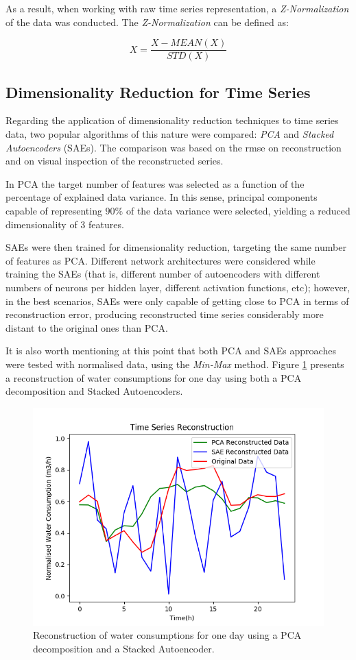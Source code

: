 \documentclass[9pt,journal,compsoc]{IEEEtran}
\begin{document}
As a result, when working with raw time series representation, a \emph{Z-Normalization} of the data was conducted. The \emph{Z-Normalization} can be defined as:

$$X = \frac{X - MEAN(X)}{STD(X)} $$

\subsection{Dimensionality Reduction for Time Series}

Regarding the application of dimensionality reduction techniques to time series data, two popular algorithms of this nature were compared: \emph{PCA} and \emph{Stacked Autoencoders} (SAEs). The comparison was based on the rmse on reconstruction and on visual inspection of the reconstructed series.

In PCA the target number of features was selected as a function of the percentage of explained data variance. In this sense, principal components capable of representing $90\%$ of the data variance were selected, yielding a reduced dimensionality of 3 features.

SAEs were then trained for dimensionality reduction, targeting the same number of features as PCA. Different network architectures were considered while training the SAEs (that is, different number of autoencoders with different numbers of neurons per hidden layer, different activation functions, etc); however, in the best scenarios, SAEs were only capable of getting close to PCA in terms of reconstruction error, producing reconstructed time series considerably more distant to the original ones than PCA.

It is also worth mentioning at this point that both PCA and SAEs approaches were tested with normalised data, using the \emph{Min-Max} method. Figure \ref{day3_reconstruction} presents a reconstruction of water consumptions for one day using both a PCA decomposition and Stacked Autoencoders.

\begin{figure}[ht]
	\centering
	\includegraphics[scale=0.5]{images/pca_sae_day3.png}
	\caption{Reconstruction of water consumptions for one day using a PCA decomposition and a Stacked Autoencoder.}
	\label{day3_reconstruction}
\end{figure}
\end{document}
